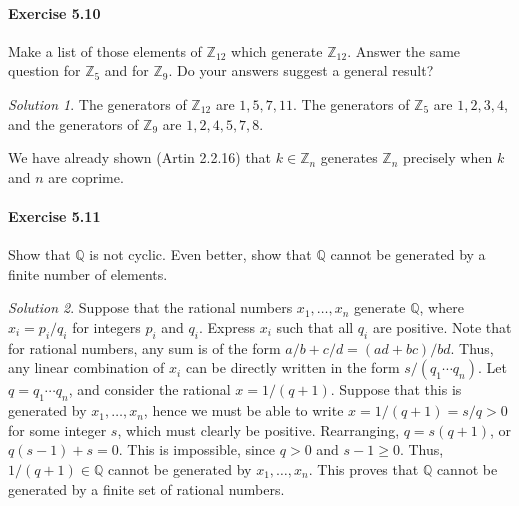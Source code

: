 \documentclass[11pt]{report}
\def\Q{\mathbb{Q}}
\def\Z{\mathbb{Z}}
\theoremstyle{remark}
\newtheorem*{solution}{Solution}
\begin{document}
    \paragraph{Exercise 5.10} Make a list of those elements of $\Z_{12}$ which
    generate $\Z_{12}$. Answer the same question for $\Z_5$ and for $\Z_9$.
    Do your answers suggest a general result?
    \begin{solution}
        The generators of $\Z_{12}$ are $1, 5, 7, 11$. The generators of $\Z_5$ are
        $1, 2, 3, 4$, and the generators of $\Z_9$ are $1, 2, 4, 5, 7, 8$.

        We have already shown (Artin 2.2.16) that $k \in \Z_n$ generates $\Z_n$
        precisely when $k$ and $n$ are coprime.
    \end{solution}

    \paragraph{Exercise 5.11} Show that $\Q$ is not cyclic. Even better, show that
    $\Q$ cannot be generated by a finite number of elements.
    \begin{solution}
        Suppose that the rational numbers $x_1, \dots, x_n$ generate $\Q$, where
        $x_i = p_i / q_i$ for integers $p_i$ and $q_i$. Express $x_i$ such that all
        $q_i$ are positive. Note that for rational numbers, any sum is of the form
        $a / b + c / d = (ad + bc) / bd$. Thus, any linear combination of $x_i$ can
        be directly written in the form $s / (q_1 \cdots q_n)$. Let $q = q_1 \cdots
        q_n$, and consider the rational $x = 1 / (q + 1)$. Suppose that this is 
        generated by $x_1, \dots, x_n$, hence we must be able to write $x = 1 / (q +
        1) = s / q > 0$ for some integer $s$, which must clearly be positive.
        Rearranging, $q = s(q + 1)$, or $q(s - 1) + s = 0$. This is impossible,
        since $q > 0$ and $s - 1 \geq 0$. Thus, $1 / (q + 1) \in \Q$ cannot be
        generated by $x_1, \dots, x_n$. This proves that $\Q$ cannot be generated by
        a finite set of rational numbers.
    \end{solution}
\end{document}

